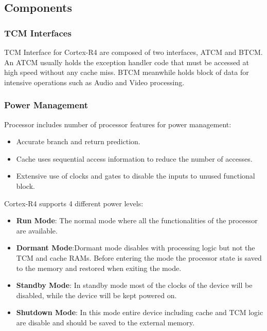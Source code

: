 \subsection{Components}

\subsubsection{\textbf{TCM Interfaces}}

TCM Interface for Cortex-R4 are composed of two interfaces, ATCM and BTCM.
An ATCM usually holds the exception handler code that must be accessed at high speed without any cache miss.
BTCM meanwhile holds block of data for intensive operations such as Audio and Video processing.


\subsubsection{\textbf{Power Management}}

Processor includes number of processor features for power management:
\begin{itemize}
	\item Accurate branch and return prediction.
	\item Cache uses sequential access information to reduce the number of accesses.
	\item Extensive use of clocks and gates to disable the inputs to unused functional block.
\end{itemize}

\begin{flushleft}
Cortex-R4 supports 4 different power levels:
\end{flushleft}
\begin{itemize}
	\item \textbf{Run Mode}: The normal mode where all the functionalities of the processor are available.
	\item \textbf{Dormant Mode}:Dormant mode disables with processing logic but not the TCM and cache RAMs. Before entering the mode the processor state is saved to the memory and restored when exiting the mode.
	\item \textbf{Standby Mode}: In standby mode most of the clocks of the device will be disabled, while the device will be kept powered on.
	\item \textbf{Shutdown Mode}: In this mode entire device including cache and TCM logic are disable and should be saved to the external memory.
\end{itemize}

